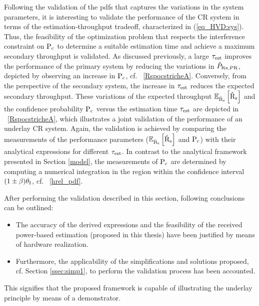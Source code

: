 Following the validation of the pdfs that captures the variations in the system parameters, it is interesting to validate the performance of the CR system in terms of the estimation-throughput tradeoff, characterized in (\ref{eq_HVD:sys}). Thus, the feasibility of the optimization problem that respects the interference constraint on $\text{P}_{\text{c}}$ to determine a suitable estimation time and achieve a maximum secondary throughput is validated. As discussed previously, a large $\tau_{\text{est}}$ improves the performance of the primary system by reducing the variations in $\hat{P}_{\text{Rx,PR}}$, depicted by observing an increase in $\text{P}_{\text{c}}$, cf. \figurename~\ref{RspocstricheA}. Conversely, from the perspective of the secondary system, the increase in $\tau_{\text{est}}$ reduces the expected secondary throughput. These variations of the expected throughput ${\mathbb E}_{\hat{\text{{R}}}_{\text{s}}}\left[ \hat{\text{{R}}}_{\text{s}} \right]$ and the confidence probability $\text{P}_{\text{c}}$ versus the estimation time $\tau_{\text{est}}$ are depicted in \figurename~\ref{RspocstricheA}, which illustrates a joint validation of the performance of an underlay CR system. Again, the validation is achieved by comparing the measurements of the performance parameters (${\mathbb E}_{\hat{\text{{R}}}_{\text{s}}}\left[ \hat{\text{{R}}}_{\text{s}} \right]$ and $\text{P}_{\text{c}}$) with their analytical expressions for different $\tau_{\text{est}}$. In contrast to the analytical framework presented in Section \ref{model}, the measurements of $\text{P}_{\text{c}}$ are determined by computing a numerical integration in the region within the confidence interval $(1  \pm \beta)  \theta_\textrm{I}$, cf. \figurename~\ref{hrel_pdf}. 

After performing the validation described in this section, following conclusions can be outlined: 
\begin{itemize}
\item The accuracy of the derived expressions and the feasibility of the received power-based estimation (proposed in this thesis) have been justified by means of hardware realization.
\item Furthermore, the applicability of the simplifications and solutions proposed, cf. Section \ref{ssec:simp1}, to perform the validation process has been accounted.    
\end{itemize}
This signifies that the proposed framework is capable of illustrating the underlay principle by means of a demonstrator.


